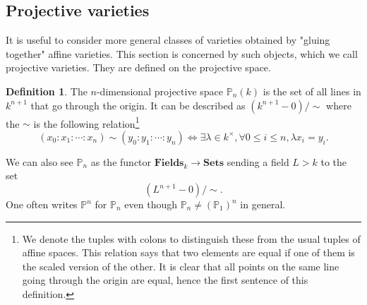 \documentclass{tufte-handout} %
\theoremstyle{definition}
\newtheorem{defn}[thm]{Definition}
\theoremstyle{remark}
\renewcommand{\P}{\mathbb{P}}
\begin{document}
\subsection{Projective varieties}
It is useful to consider more general classes of varieties obtained by "gluing together" affine varieties. This section is concerned by such objects, which we call projective varieties. They are defined on the projective space.
\begin{defn}
	The $n$-dimensional projective space $\P_n(k)$ is the set of all lines in $k^{n+1}$ that go through the origin. It can be described as $(k^{n+1}-0)/\sim$ where the $\sim$ is the following relation\footnote{We denote the tuples with colons to distinguish these from the usual tuples of affine spaces. This relation says that two elements are equal if one of them is the scaled version of the other. It is clear that all points on the same line going through the origin are equal, hence the first sentence of this definition.}
	\[(x_0: x_1: \cdots : x_n) \sim (y_0: y_1 : \cdots: y_n) \Leftrightarrow \exists \lambda \in k^{\times}, \forall 0\leq i \leq n, \lambda x_i = y_i.\]
	
	We can also see $\P_n$ as the functor $\textbf{Fields}_k \rightarrow \textbf{Sets}$ sending a field $L>k$ to the set \[(L^{n+1}- 0)/\sim.\]
	One often writes $\P^n$ for $\P_n$ even though $\P_n \neq (\P_1)^n$ in general.
\end{defn}
\end{document}
